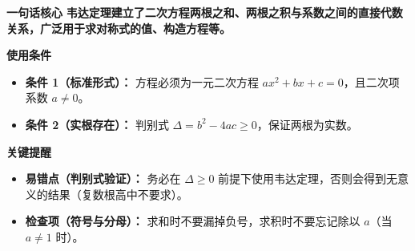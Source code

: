 \begin{summarybox}
	\textbf{\textcolor{CSummary}{一句话核心}}
	\textbf{韦达定理建立了二次方程两根之和、两根之积与系数之间的直接代数关系，广泛用于求对称式的值、构造方程等。}

	\medskip
	\textbf{\textcolor{CSummary}{使用条件}}
	\begin{itemize}[leftmargin=*, itemsep=0.5em, topsep=0.4em]
		\item \textbf{条件 1（标准形式）：} 方程必须为一元二次方程 $ax^2+bx+c=0$，且二次项系数 $a\neq0$。
		\item \textbf{条件 2（实根存在）：} 判别式 $\Delta=b^2-4ac\geq0$，保证两根为实数。
	\end{itemize}

	\medskip
	\textbf{\textcolor{CSummary}{关键提醒}}
	\begin{itemize}[leftmargin=*, itemsep=0.5em, topsep=0.4em]
		\item \textbf{易错点（判别式验证）：} 务必在 $\Delta\geq0$ 前提下使用韦达定理，否则会得到无意义的结果（复数根高中不要求）。
		\item \textbf{检查项（符号与分母）：} 求和时不要漏掉负号，求积时不要忘记除以 $a$（当 $a\neq1$ 时）。
	\end{itemize}

\end{summarybox}
